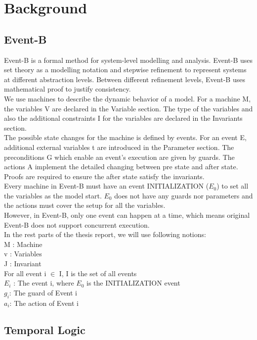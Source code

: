 
\section{Background}
\label{sec:Background}


\subsection{Event-B}
Event-B is a formal method for system-level modelling and analysis. Event-B uses set theory as a modelling notation and stepwise refinement to represent systems at different abstraction levels. Between different refinement levels, Event-B uses mathematical proof to justify consistency. \\
We use machines to describe the dynamic behavior of a model. For a machine M, the variables V are declared in the Variable section. The type of the variables and also the additional constraints I for the variables are declared in the Invariants section. \\
The possible state changes for the machine is defined by events. For an event E, additional external variables t are introduced in the Parameter section. The preconditions G which enable an event’s execution are given by guards. The actions A implement the detailed changing between pre state and after state. Proofs are required to ensure the after state satisfy the invariants.\\
Every machine in Event-B must have an event INITIALIZATION ($E_{0}$) to set all the variables as the model start. $E_{0}$ does not have any guards nor parameters and the actions must cover the setup for all the variables.\\
However, in Event-B, only one event can happen at a time, which means original Event-B does not support concurrent execution.\\
In the rest parts of the thesis report, we will use following notions:\\
M : Machine\\
v : Variables\\
J : Invariant\\
For all event i $\in$ I, I is the set of all events\\
$E_{i}$ : The event i, where $E_{0}$ is the INITIALIZATION event\\
$g_{i}$: The guard of Event i\\
$a_{i}$: The action of Event i\\
\subsection{Temporal Logic}

